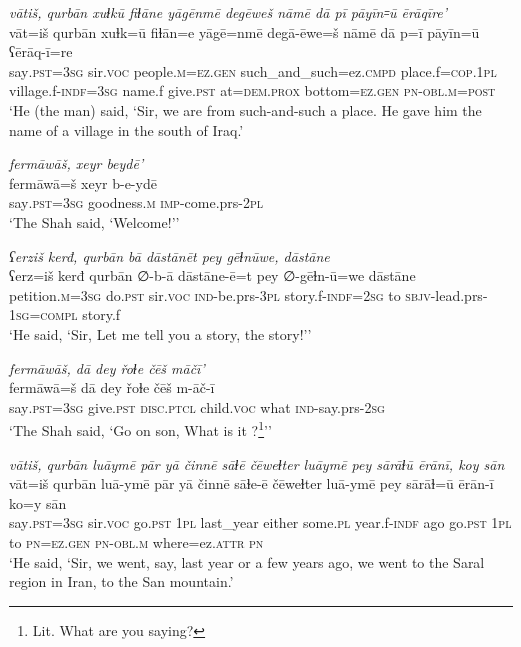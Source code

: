 \ea \label{ZQ.5}
\textit{vātiš, qurbān xuɫkū fiɫāne yāgēnmē degēweš nāmē dā pī pāyīn꞊ū ērāqīre'} \\ 
\gll vāt=iš qurbān xuɫk=ū fiɫān=e yāgē=nmē degā-ēwe=š nāmē dā p=ī pāyīn=ū ʕērāq-ī=re \\ 
 say\textsc{.pst}\textsc{=3sg} sir.\textsc{voc} people\textsc{.m}\textsc{=ez.gen} such\_and\_such=ez\textsc{.cmpd} place.f\textsc{=cop}\textsc{.\textsc{1pl}} village.f\textsc{-indf}\textsc{=3sg} name.f give\textsc{.pst} at=\textsc{dem.prox} bottom\textsc{=ez.gen} \textsc{pn}\textsc{-obl}\textsc{.m}\textsc{=\textsc{post}} \\ 
\glt `He (the man) said, ‘Sir, we are from such-and-such a place. He gave him the name of a village in the south of Iraq.'
\z 
 
\ea \label{ZQ.6}
\textit{fermāwāš, xeyr beydē’} \\ 
\gll fermāwā=š xeyr b-e-ydē \\ 
 say\textsc{.pst}\textsc{=3sg} goodness\textsc{.m} \textsc{imp-}come.prs-\textsc{2pl} \\ 
\glt `The Shah said, ‘Welcome!’'
\z 
 
\ea \label{ZQ.7}
\textit{ʕerziš kerđ, qurbān bā dāstānēt pey gēɫnūwe, dāstāne} \\ 
\gll ʕerz=iš kerđ qurbān ∅-b-ā dāstāne-ē=t pey ∅-gēɫn-ū=we dāstāne \\ 
 petition\textsc{.m}\textsc{=3sg} do\textsc{.pst} sir.\textsc{voc} \textsc{ind-}be.prs\textsc{-3pl} story.f\textsc{-indf}\textsc{=\textsc{2sg}} to \textsc{sbjv-}lead.prs\textsc{-\textsc{1sg}}\textsc{=compl} story.f \\ 
\glt `He said, ‘Sir, Let me tell you a story, the story!’'
\z 
 
\ea \label{ZQ.8}
\textit{fermāwāš, dā dey řoɫe čēš māčī’} \\ 
\gll fermāwā=š dā dey řoɫe čēš m-āč-ī \\ 
 say\textsc{.pst}\textsc{=3sg} give\textsc{.pst} \textsc{disc.ptcl} child.\textsc{voc} what \textsc{ind-}say.prs-\textsc{2sg} \\ 
\glt `The Shah said, ‘Go on son, What is it ?\footnote{Lit. What are you saying?}’'
\z 
 
\ea \label{ZQ.9}
\textit{vātiš, qurbān luāymē pār yā činnē sāɫē čēweɫter luāymē pey sārāɫū ērānī, koy sān} \\ 
\gll vāt=iš qurbān luā-ymē pār yā činnē sāɫe-ē čēweɫter luā-ymē pey sārāɫ=ū ērān-ī ko=y sān \\ 
 say\textsc{.pst}\textsc{=3sg} sir.\textsc{voc} go\textsc{.pst} \textsc{1pl} last\_year either some\textsc{.pl} year.f\textsc{-indf} ago go\textsc{.pst} \textsc{1pl} to \textsc{pn}\textsc{=ez.gen} \textsc{pn}\textsc{-obl}\textsc{.m} where=ez.\textsc{attr} \textsc{pn} \\ 
\glt `He said, ‘Sir, we went, say, last year or a few years ago, we went to the Saral region in Iran, to the San mountain.'
\z 
 
